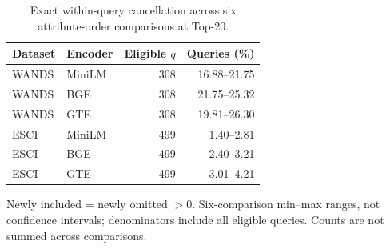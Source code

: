 \begin{table}[t]
\centering
\caption{Exact within-query cancellation across six attribute-order comparisons at Top-20.}
\label{tab:revision-cancellation}
\small
\begin{tabular}{llrr}
\toprule
Dataset & Encoder & Eligible $q$ & Queries (\%) \\
\midrule
WANDS & MiniLM & 308 & 16.88--21.75 \\
WANDS & BGE & 308 & 21.75--25.32 \\
WANDS & GTE & 308 & 19.81--26.30 \\
\midrule
ESCI & MiniLM & 499 & 1.40--2.81 \\
ESCI & BGE & 499 & 2.40--3.21 \\
ESCI & GTE & 499 & 3.01--4.21 \\
\bottomrule
\end{tabular}
\par\smallskip
\begin{minipage}{\columnwidth}\small
Newly included = newly omitted $>0$. Six-comparison min--max ranges, not confidence intervals; denominators include all eligible queries. Counts are not summed across comparisons.
\end{minipage}
\end{table}
